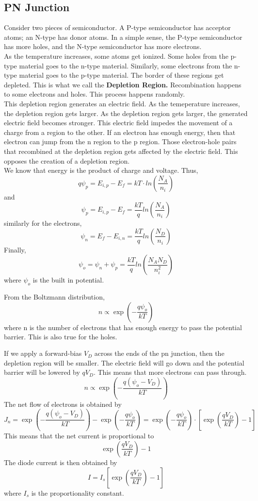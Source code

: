 \documentclass{article}
\begin{document}
\subsection{PN Junction}
\noindent 
Consider two pieces of semiconductor. A P-type semiconductor has acceptor atoms; 
an N-type has donor atoms. In a simple sense, the P-type semiconductor has more holes,
and the N-type semiconductor has more electrons. 
\vspace{8pt}
\\
As the temperature increases, some atoms get ionized. Some holes from the p-type 
material goes to the n-type material. Similarly, some electrons from the n-type 
material goes to the p-type material. The border of these regions get depleted. 
This is what we call the \textbf{Depletion Region.} Recombination happens to some 
electrons and holes. This process happens randomly. 
\vspace{8pt}
\\ This depletion region generates an electric field. As the temeperature increases, 
the depletion region gets larger. As the depletion region gets larger, the generated
electric field becomes stronger. This electric field impedes the movement of a charge
from a region to the other. If an electron has enough energy, then that electron can 
jump from the n region to the p region. Those electron-hole pairs that recombined at 
the depletion region gets affected by the electric field. This opposes the creation of
a depletion region. 
\vspace{8pt}
\\ We know that energy is the product of charge and voltage. Thus,
$$q\psi_p = E_{i,p} - E_{f} = kT \cdot ln\left(\frac{N_A}{n_i}\right)$$
and $$\psi_p = E_{i,p} - E_{f} = \frac{kT}{q} ln\left(\frac{N_A}{n_i}\right)$$
similarly for the electrons, 
$$\psi_n = E_{f} - E_{i,n} = \frac{kT}{q} ln\left(\frac{N_D}{n_i}\right)$$
Finally, 
$$\boxed{\psi_o = \psi_n + \psi_p = \frac{kT}{q}ln\left(\frac{N_A N_D}{n_i^2} \right)}$$ 
where $\psi_o$ is the built in potential. 

\vspace{8pt}
\noindent  
From the Boltzmann distribution, 
$$n \propto \exp\left(-\frac{q\psi_o}{kT}\right)$$
where n is the number of electrons that has enough energy to pass the potential barrier.
This is also true for the holes. 

\vspace{8pt}
\noindent  
If we apply a forward-bias $V_D$ across the ends of the pn junction, then the depletion 
region will be smaller. The electric field will go down and the potential barrier will 
be lowered by $qV_D$. This means that more electrons can pass through. 
$$n \propto \exp\left(-\frac{q(\psi_o -V_D)}{kT}\right)$$ The net flow of electrons is 
obtained by $$\boxed{J_n = \exp\left(-\frac{q(\psi_o -V_D)}{kT}\right)-
\exp\left(-\frac{q\psi_o}{kT}\right) = \exp\left(-\frac{q\psi_o}{kT}\right)\cdot 
\left[\exp\left(\frac{qV_D}{kT}\right)-1\right]}$$
This means that the net current is proportional to
$$\exp\left(\frac{qV_D}{kT}\right)-1$$
The diode current is then obtained by 
$$\boxed{I = I_s \left[\exp\left(\frac{qV_D}{kT}\right)-1\right]}$$ 
where $I_s$ is the proportionality constant. 
\end{document}
